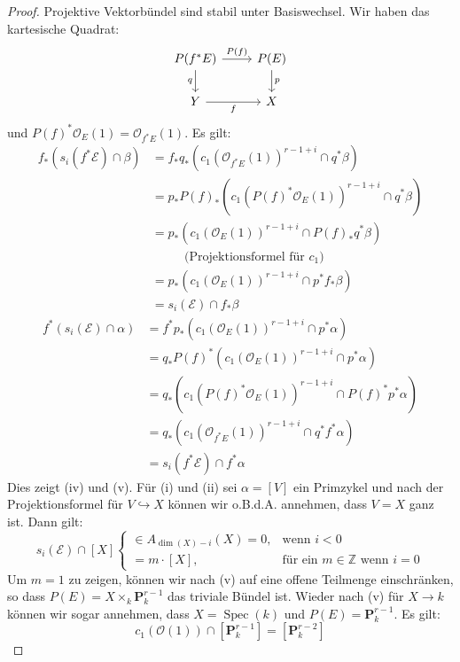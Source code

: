 \documentclass[10pt,b5paper]{article}
\begin{document}
\begin{proof}
Projektive Vektorbündel sind stabil unter Basiswechsel. Wir haben das kartesische Quadrat:
\[ \begin{tikzcd}
P(f^\ast E) \rar["P(f)"]\dar["q"'] & P(E) \dar["p"] \\
Y \rar["f"'] & X
\end{tikzcd} \]
und $P(f)^\ast\mathcal{O}_E(1) = \mathcal{O}_{f^\ast E}(1)$. Es gilt:
\begin{align*}
f_\ast(s_i(f^\ast\mathcal{E})\cap\beta) &= f_\ast q_\ast(c_1(\mathcal{O}_{f^\ast E}(1))^{r-1+i}\cap q^\ast \beta)\\
&= p_\ast P(f)_\ast (c_1(P(f)^\ast\mathcal{O}_E(1))^{r-1+i}\cap q^\ast\beta)\\
&= p_\ast(c_1(\mathcal{O}_E(1))^{r-1+i}\cap P(f)_\ast q^\ast\beta) \\
&\phantom{==} \text{(Projektionsformel für $c_1$)}\\
&= p_\ast(c_1(\mathcal{O}_E(1))^{r-1+i}\cap p^\ast f_\ast\beta)\\
&= s_i(\mathcal{E})\cap f_\ast\beta
\end{align*}
\begin{align*}
f^\ast(s_i(\mathcal{E})\cap\alpha) &= f^\ast p_\ast(c_1(\mathcal{O}_E(1))^{r-1+i}\cap p^\ast\alpha)\\
&= q_\ast P(f)^\ast(c_1(\mathcal{O}_E(1))^{r-1+i}\cap p^\ast \alpha)\\
&= q_\ast(c_1(P(f)^\ast\mathcal{O}_{E}(1))^{r-1+i}\cap P(f)^\ast p^\ast \alpha)\\
&= q_\ast(c_1(\mathcal{O}_{f^\ast E}(1))^{r-1+i}\cap q^\ast f^\ast \alpha)\\
&= s_i(f^\ast\mathcal{E})\cap f^\ast\alpha
\end{align*}
Dies zeigt (iv) und (v). Für (i) und (ii) sei $\alpha = [V]$ ein Primzykel und nach der Projektionsformel für $V\hookrightarrow X$ können wir o.B.d.A. annehmen, dass $V=X$ ganz ist. Dann gilt:
\[s_i(\mathcal{E})\cap [X] \begin{cases}
\in A_{\dim(X)-i}(X) = 0, & \text{wenn $i<0$}\\
= m\cdot [X], & \text{für ein $m\in \mathbb{Z}$ wenn $i = 0$}
\end{cases}
\]
Um $m=1$ zu zeigen, können wir nach (v) auf eine offene Teilmenge einschränken, so dass $P(E)=X\times_k\mathbf{P}^{r-1}_k$ das triviale Bündel ist. Wieder nach (v) für $X\to k$ können wir sogar annehmen, dass $X=\operatorname{Spec}(k)$ und $P(E)=\mathbf{P}_k^{r-1}$. Es gilt:
\[ c_1(\mathcal{O}(1))\cap [\mathbf{P}_k^{r-1}] = [\mathbf{P}_k^{r-2}] \]

\end{proof}
\end{document}
